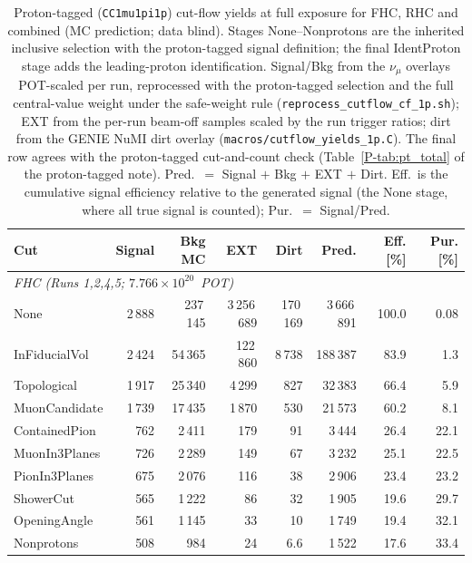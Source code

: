 \documentclass[11pt,a4paper]{article}
\newcommand{\ptref}[2]{#1~\ref{P-#2} of the proton-tagged note}
\begin{document}
\begin{table}[H]
  \centering
  \caption{Proton-tagged (\texttt{CC1mu1pi1p}) cut-flow yields at full exposure for
    FHC, RHC and combined (MC prediction; data blind). Stages None--Nonprotons are the
    inherited inclusive selection with the proton-tagged signal definition; the final
    IdentProton stage adds the leading-proton identification. Signal/Bkg from the
    $\nu_\mu$ overlays POT-scaled per run, reprocessed with the proton-tagged selection
    and the full central-value weight under the safe-weight rule
    (\texttt{reprocess\_cutflow\_cf\_1p.sh}); EXT from the per-run beam-off
    samples scaled by the run trigger ratios; dirt from the GENIE NuMI dirt overlay
    (\texttt{macros/cutflow\_yields\_1p.C}). The final row agrees with the
    proton-tagged cut-and-count check (\ptref{Table}{tab:pt_total}). Pred.\ $=$ Signal $+$ Bkg $+$ EXT $+$ Dirt. Eff.\ is the cumulative signal efficiency relative to the generated signal (the None stage, where all true signal is counted); Pur.\ $=$ Signal/Pred.}
  \label{tab:cutflow_1p}
  \small
  \begin{tabular}{lrrrrrrr}
    \toprule
    Cut & Signal & Bkg MC & EXT & Dirt & Pred. & Eff. [\%] & Pur. [\%] \\
    \midrule
    \multicolumn{8}{l}{\textit{FHC (Runs 1,2,4,5; $7.766\times10^{20}$~POT)}} \\
    None             & 2\,888 & 237\,145 & 3\,256\,689 & 170\,169 & 3\,666\,891 & 100.0 & 0.08 \\
    InFiducialVol    & 2\,424 & 54\,365 & 122\,860 & 8\,738 & 188\,387 & 83.9 & 1.3 \\
    Topological      & 1\,917 & 25\,340 & 4\,299 & 827 & 32\,383 & 66.4 & 5.9 \\
    MuonCandidate    & 1\,739 & 17\,435 & 1\,870 & 530 & 21\,573 & 60.2 & 8.1 \\
    ContainedPion    & 762 & 2\,411 & 179 & 91 & 3\,444 & 26.4 & 22.1 \\
    MuonIn3Planes    & 726 & 2\,289 & 149 & 67 & 3\,232 & 25.1 & 22.5 \\
    PionIn3Planes    & 675 & 2\,076 & 116 & 38 & 2\,906 & 23.4 & 23.2 \\
    ShowerCut        & 565 & 1\,222 & 86 & 32 & 1\,905 & 19.6 & 29.7 \\
    OpeningAngle     & 561 & 1\,145 & 33 & 10 & 1\,749 & 19.4 & 32.1 \\
    Nonprotons       & 508 & 984 & 24 & 6.6 & 1\,522 & 17.6 & 33.4 \\

\end{tabular}
\end{table}
\end{document}
